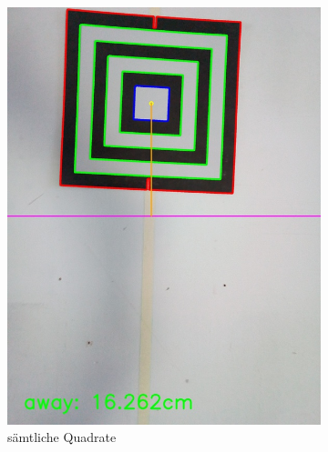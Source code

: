 \begin{figure}
\begin{subfigure}{0.3\textwidth}
        \includegraphics[width=0.95\linewidth]{pics/zielfeld/05.jpg}
        \caption{sämtliche Quadrate}
        \label{fig:zielfeld5}
    \end{subfigure}
    \begin{subfigure}{0.3\textwidth}
        \centering

\end{subfigure}
\end{figure}
